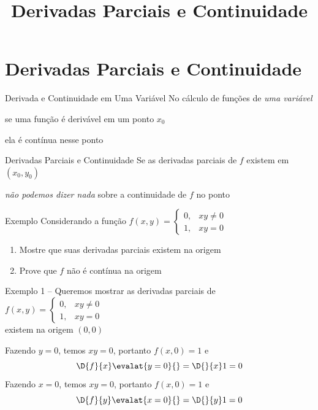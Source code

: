 \documentclass[fleqn,utf8,aspectratio=169,12pt,ignorenonframetext]{beamer}
\title{Derivadas Parciais e Continuidade}
\begin{document}
\addtitle

\section{Derivadas Parciais e Continuidade}

\begin{frame}{Derivada e Continuidade em Uma Variável}
  No cálculo de funções de \emph{uma variável}

  \pause
  se uma função é derivável em um ponto $x_0$

  \pause
  ela é contínua nesse ponto
\end{frame}

\begin{frame}{Derivadas Parciais e Continuidade}
  Se as derivadas parciais de $f$ existem em $(x_0, y_0)$

  \pause
  \emph{não podemos dizer nada} sobre a continuidade de $f$ no ponto
\end{frame}

\addtocounter{exemplo}{1}
\begin{frame}{Exemplo \theexemplo}
  Considerando a função
  \(
  f(x, y) = \begin{cases}
    0, & xy \neq 0 \\
    1, & xy = 0
  \end{cases}
  \)
  \begin{enumerate}
    \item Mostre que suas derivadas parciais existem na origem
    \item Prove que $f$ não é contínua na origem
  \end{enumerate}
\end{frame}

\begin{frame}{Exemplo \theexemplo}
  1 -- Queremos mostrar as derivadas parciais de
  \(
  f(x, y) = \begin{cases}
    0, & xy \neq 0 \\
    1, & xy = 0
  \end{cases}
  \)\\
  existem na origem $(0, 0)$

  \pause
  Fazendo $y=0$,
  \pause
  temos $xy=0$,
  \pause
  portanto \(f(x, 0) = 1\)
  \pause
  e
  \[
    \D{f}{x}\evalat{y=0}{} = \D{}{x} 1  = 0
  \]
  \pause
  Fazendo $x=0$,
  \pause
  temos $xy=0$,
  \pause
  portanto \(f(x, 0) = 1\)
  \pause
  e
  \[
    \D{f}{y}\evalat{x=0}{} = \D{}{y} 1  = 0
  \]

\end{frame}
\end{document}
